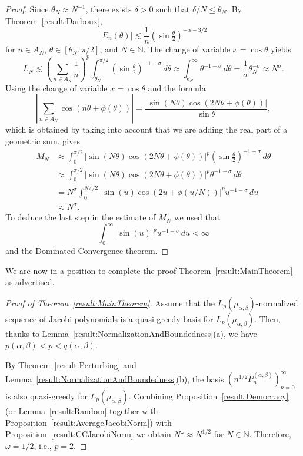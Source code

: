 \documentclass[11pt, leqno]{amsart}
\theoremstyle{remark}
\numberwithin{equation}{section}
\newcommand{\NN}{\ensuremath{\mathbb{N}}}
\begin{document}
\begin{proof}
Since $\theta_N\approx N^{-1}$, there exists $\delta>0$ such that $\delta/N\le \theta_N$. By Theorem~\ref{result:Darboux},
\[
|E_n(\theta)|\lesssim \frac{1}{n} (\sin \tfrac{\theta}{2})^{-\alpha-3/2}
\]
for $n\in A_N$, $\theta\in[\theta_N,\pi/2]$, and $N\in\NN$.
The change of variable $x=\cos\theta$ yields
\[
L_N\lesssim\left( \sum_{n\in A_N} \frac{1}{n}\right)^p \int_{\theta_N}^{\pi/2} 
( \sin\tfrac{\theta}{2})^ {-1-\sigma} \, d\theta
\approx \int_{\theta_N}^\infty \theta^{-1-\sigma}\, d\theta 
= \frac{1}{\sigma} \theta_N^{-\sigma} \approx N^\sigma.
\]
Using the change of variable $x=\cos\theta$ and the formula
\[
\left| \sum_{n\in A_N} \cos(n\theta+\phi(\theta))\right|
= \frac{|\sin(N\theta) \cos(2N\theta+\phi(\theta))|}{\sin \theta},
\]
which is obtained by taking into account that we are adding the real part of a geometric sum, gives
\begin{align*}
M_N &\approx \int_{0}^{\pi/2} |\sin(N\theta) \cos(2N\theta+\phi(\theta))|^p 
(\sin\tfrac{\theta}{2})^{-1-\sigma}\,d\theta \\
&\approx \int_{0}^{\pi/2} |\sin(N\theta) \cos(2N\theta+\phi(\theta))|^p \theta^{-1-\sigma}\,d\theta \\
&= N^\sigma \int_{0}^{N\pi/2} |\sin(u) \cos(2u+\phi(u/N))|^p u^{-1-\sigma} \, du \\
& \approx N^\sigma.
\end{align*}
To deduce the last step in the estimate of $M_{N}$ we used that
\[
 \int_0^\infty |\sin(u)|^p  u^{-1-\sigma} \, du<\infty
\]
and the Dominated Convergence theorem.
\end{proof}

We are now in a position to complete the proof Theorem~\ref{result:MainTheorem} as advertised.

\begin{proof}[Proof of Theorem~\ref{result:MainTheorem}]
Assume that the $L_p(\mu_{\alpha,\beta})$-normalized sequence of Jacobi polynomials 
is a quasi-greedy basis for $L_p(\mu_{\alpha,\beta})$.
Then, thanks to Lemma~\ref{result:NormalizationAndBoundedness}(a), we have $p(\alpha,\beta)<p<q(\alpha,\beta)$.

By Theorem~\ref{result:Perturbing} and Lemma~\ref{result:NormalizationAndBoundedness}(b), the basis
$(n^{1/2} P_n^{(\alpha,\beta)})_{n=0}^\infty$ is also quasi-greedy for $L_p(\mu_{\alpha,\beta})$. 
Combining Proposition~\ref{result:Democracy} 
(or Lemma~\ref{result:Random} together with Proposition~\ref{result:AverageJacobiNorm}) with
Proposition~\ref{result:CCJacobiNorm} we obtain
$N^\omega \approx N^{1/2}$ for $N\in\NN$.
Therefore, $\omega=1/2$, i.e., $p=2$.
\end{proof}
\end{document}
